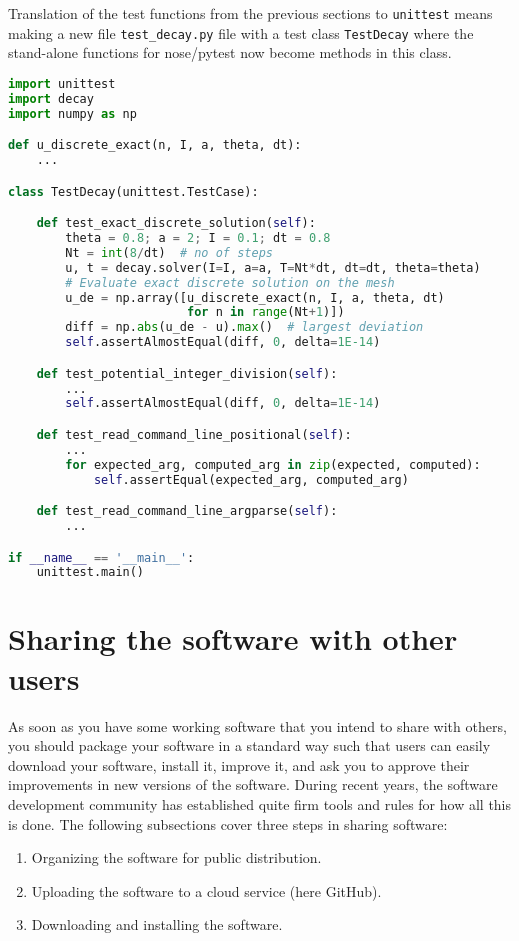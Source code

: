 \documentclass[graybox,sectrefs,envcountresetchap,open=right,final]{svmonodo}
\begin{document}
Translation of the test functions from the previous sections
to \texttt{unittest} means making a new file \Verb!test_decay.py! file with a
test class \texttt{TestDecay} where the stand-alone functions for
nose/pytest now become methods in this class.

\begin{lstlisting}[language=Python,style=blue1_bluegreen]
import unittest
import decay
import numpy as np

def u_discrete_exact(n, I, a, theta, dt):
    ...

class TestDecay(unittest.TestCase):

    def test_exact_discrete_solution(self):
        theta = 0.8; a = 2; I = 0.1; dt = 0.8
        Nt = int(8/dt)  # no of steps
        u, t = decay.solver(I=I, a=a, T=Nt*dt, dt=dt, theta=theta)
        # Evaluate exact discrete solution on the mesh
        u_de = np.array([u_discrete_exact(n, I, a, theta, dt)
                         for n in range(Nt+1)])
        diff = np.abs(u_de - u).max()  # largest deviation
        self.assertAlmostEqual(diff, 0, delta=1E-14)

    def test_potential_integer_division(self):
        ...
        self.assertAlmostEqual(diff, 0, delta=1E-14)

    def test_read_command_line_positional(self):
        ...
        for expected_arg, computed_arg in zip(expected, computed):
            self.assertEqual(expected_arg, computed_arg)

    def test_read_command_line_argparse(self):
        ...

if __name__ == '__main__':
    unittest.main()
\end{lstlisting}


\section{Sharing the software with other users}
\label{softeng1:prog:se:git}

As soon as you have some working software that you intend to share
with others, you should package your software in a standard way such
that users can easily download your software, install it, improve it,
and ask you to approve their improvements in new versions of the software.
During recent years, the software development community has established
quite firm tools and rules for how all this is done. The following
subsections cover three steps in sharing software:

\begin{enumerate}
\item Organizing the software for public distribution.

\item Uploading the software to a cloud service (here GitHub).

\item Downloading and installing the software.
\end{enumerate}
\end{document}
